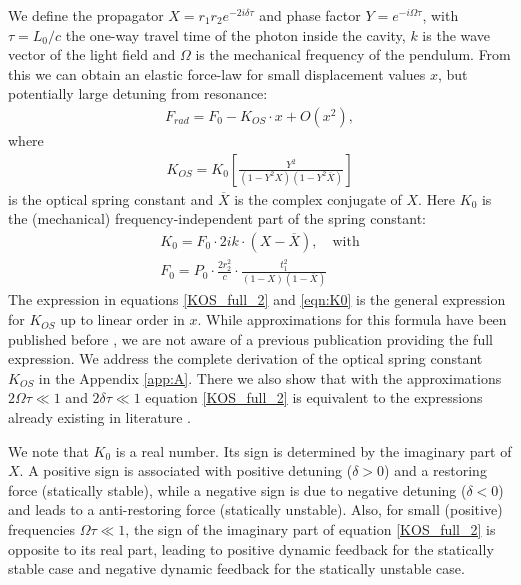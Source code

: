 We define the propagator $X=r_1r_2e^{-2i\delta\tau}$ and phase factor $Y=e^{-i\Omega\tau}$, with $\tau=L_0/c$ the one-way
travel time of the photon inside the cavity, $k$ is the wave vector of the light field  and $\Omega$ 
is the mechanical frequency of the pendulum. From this we can obtain an elastic force-law for small displacement values $x$, but potentially large detuning from resonance:
\begin{eqnarray}
\label{eqn:Frd}
F_{rad}=F_0-K_{OS}\cdot x + O(x^2),
\end{eqnarray}
where
\begin{eqnarray}
\label{KOS_full_2}
K_{OS}=K_0\left [ \frac{Y^2}{(1-Y^2X)(1-Y^2\overline{X})}  \right ]
\end{eqnarray}
is the optical spring constant and $\overline{X}$ is the complex conjugate of $X$. Here $K_0$ is the 
(mechanical) frequency-independent part of the spring constant:
\begin{eqnarray}
\label{eqn:K0}
K_0=F_0 \cdot 2 i k \cdot (X-\overline{X}),   \quad \mbox{with}\nonumber\\ 
F_0 = P_0 \cdot \frac{2  r_2^2}{c} \cdot \frac{t_1^2}{(1-X)(1-\overline{X})}
\end{eqnarray}
The expression in equations \ref{KOS_full_2} and \ref{eqn:K0}
is the general expression for $K_{OS}$ up to linear order in $x$. While approximations for this formula have been published before \cite{Barginsky02}, we are not aware of a previous publication providing the full expression.
We address the complete derivation of the optical spring constant $K_{OS}$ in the Appendix \ref{app:A}. There we also show that with the approximations $2\Omega\tau\ll1$ and $2\delta\tau\ll1$  equation \ref{KOS_full_2} is equivalent to the expressions already existing in literature \cite{Barginsky02,Corbitt07}. 

We note that $K_0$ is a real number. Its sign is determined by the imaginary part of $X$. A positive sign is associated with positive detuning ($\delta>0$) and a restoring force (statically stable),  while a negative sign is due to  negative detuning ($\delta<0$) and
leads to a anti-restoring force  (statically unstable).  Also, for small (positive) frequencies $\Omega\tau\ll1$, the sign of the imaginary part of equation \ref{KOS_full_2} is opposite to its real part, leading to positive dynamic feedback for the statically stable case and  negative dynamic feedback for the statically unstable case.

